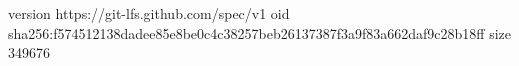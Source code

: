 version https://git-lfs.github.com/spec/v1
oid sha256:f574512138dadee85e8be0c4c38257beb26137387f3a9f83a662daf9c28b18ff
size 349676
